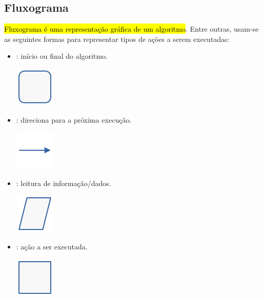 \subsection{Fluxograma}

\hl{Fluxograma é uma representação gráfica de um algoritmo}. Entre outras, usam-se as seguintes formas para representar tipos de ações a serem executadas:

\begin{itemize}
\item {}: início ou final do algoritmo.
  \begin{center}
    \includegraphics[width=0.75in]{./cap_lingua/dados/fig_fluxograma/terminal.png}
  \end{center}  
\item {}: direciona para a próxima execução.
  \begin{center}
    \includegraphics[width=0.75in]{./cap_lingua/dados/fig_fluxograma/linha.png}
  \end{center}
\item {}: leitura de informação/dados.
  \begin{center}
    \includegraphics[width=0.75in]{./cap_lingua/dados/fig_fluxograma/entrada.png}
  \end{center}  
\item {}: ação a ser executada.
  \begin{center}
    \includegraphics[width=0.75in]{./cap_lingua/dados/fig_fluxograma/processo.png}
  \end{center}

\end{itemize}
